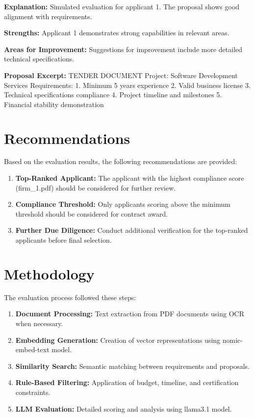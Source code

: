 \documentclass[12pt,a4paper]{article}
\begin{document}
\textbf{Explanation:} Simulated evaluation for applicant 1. The proposal shows good alignment with requirements.

\textbf{Strengths:} Applicant 1 demonstrates strong capabilities in relevant areas.

\textbf{Areas for Improvement:} Suggestions for improvement include more detailed technical specifications.

\textbf{Proposal Excerpt:} TENDER DOCUMENT
Project: Software Development Services
Requirements:
1. Minimum 5 years experience
2. Valid business license
3. Technical specifications compliance
4. Project timeline and milestones
5. Financial stability demonstration

\newpage


\section*{Recommendations}

Based on the evaluation results, the following recommendations are provided:

\begin{enumerate}
    \item \textbf{Top-Ranked Applicant:} The applicant with the highest compliance score (firm_1.pdf) should be considered for further review.
    \item \textbf{Compliance Threshold:} Only applicants scoring above the minimum threshold should be considered for contract award.
    \item \textbf{Further Due Diligence:} Conduct additional verification for the top-ranked applicants before final selection.
\end{enumerate}

\section*{Methodology}

The evaluation process followed these steps:

\begin{enumerate}
    \item \textbf{Document Processing:} Text extraction from PDF documents using OCR when necessary.
    \item \textbf{Embedding Generation:} Creation of vector representations using nomic-embed-text model.
    \item \textbf{Similarity Search:} Semantic matching between requirements and proposals.
    \item \textbf{Rule-Based Filtering:} Application of budget, timeline, and certification constraints.
    \item \textbf{LLM Evaluation:} Detailed scoring and analysis using llama3.1 model.
\end{enumerate}
\end{document}

